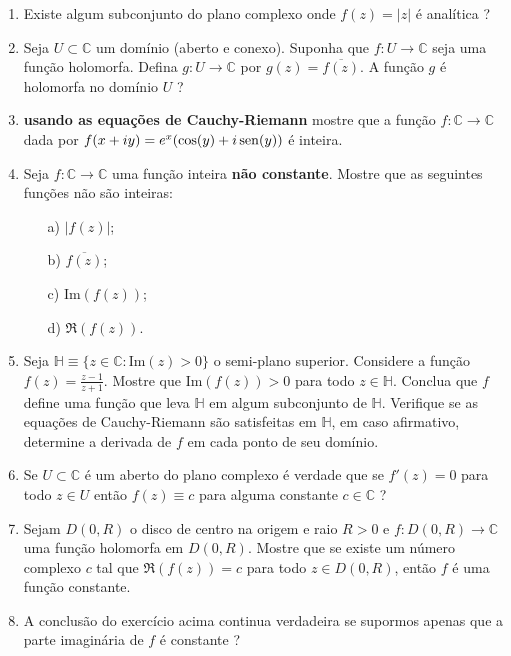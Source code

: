 \begin{enumerate}[leftmargin=*]
	\item Existe algum subconjunto do plano complexo onde $f(z)=|z|$ é analítica ?
	
	\item Seja $U\subset \mathbb{C}$ um domínio (aberto e conexo). Suponha que $f:U\to\mathbb{C}$ seja uma função 
	holomorfa. Defina $g:U\to\mathbb{C}$ por $g(z)=\overline{f(z)}$. A função $g$ é holomorfa no domínio $U$ ?


	\item {\bf usando as equações de Cauchy-Riemann} mostre que a função 
	$f:\mathbb{C}\to\mathbb{C}$ dada por $f(x+iy)=e^x(\cos(y)+i\operatorname{sen}(y))$ é inteira.
	

	\item Seja $f:\mathbb{C}\to\mathbb{C}$ uma função inteira {\bf não constante}. Mostre que as seguintes funções não 
	são inteiras:
	\begin{itemize}
		\item[a)] $|f(z)|$;
		\item[b)] $\overline{f(z)}$;
		\item[c)] $\text{Im}(f(z))$;
		\item[d)] $\Re(f(z))$.
	\end{itemize}



	\item Seja $\mathbb{H}\equiv\{z\in\mathbb{C}: \text{Im}(z)>0\}$ o semi-plano superior. Considere a função 
	$f(z)=\frac{z-1}{z+1}$. Mostre que $\text{Im}(f(z))>0$ para todo $z\in\mathbb{H}$. Conclua que 
	$f$ define uma função que leva $\mathbb{H}$ em algum subconjunto de $\mathbb{H}$. Verifique se as equações 
	de Cauchy-Riemann são satisfeitas em $\mathbb{H}$, em caso afirmativo, determine a derivada de $f$ em cada ponto de
	seu domínio.



	\item Se $U\subset\mathbb{C}$ é um aberto do plano complexo é verdade que se $f'(z)=0$ para todo $z\in U$ então 
	$f(z)\equiv c$ para alguma constante $c\in\mathbb{C}$ ?



	\item Sejam $D(0,R)$ o disco de centro na origem e raio $R>0$ e $f:D(0,R)\to \mathbb{C}$ uma função holomorfa em 
	$D(0,R)$. Mostre que se existe um número complexo $c$ tal que $\Re(f(z))= c$ para todo $z\in D(0,R)$, então 
	$f$ é uma função constante.



	\item A conclusão do exercício acima continua verdadeira se supormos apenas que a parte imaginária 
	de $f$ é constante ?
	

\end{enumerate}
